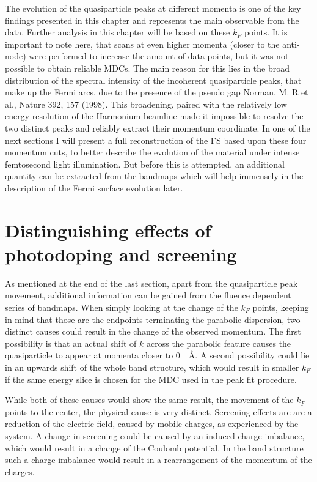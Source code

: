 The evolution of the quasiparticle peaks at different momenta is one of the key findings presented in this chapter and represents the main observable from the data.
Further analysis in this chapter will be based on these $k_F$ points.
It is important to note here, that scans at even higher momenta (closer to the anti-node) were performed to increase the amount of data points, but it was not possible to obtain reliable MDCs.
The main reason for this lies in the broad distribution of the spectral intensity of the incoherent quasiparticle peaks, that make up the Fermi arcs, due to the presence of the pseudo gap \cite{bibid} Norman, M. R et al., Nature 392, 157 (1998).
This broadening, paired with the relatively low energy resolution of the Harmonium beamline made it impossible to resolve the two distinct peaks and reliably extract their momentum coordinate.
In one of the next sections I will present a full reconstruction of the FS based upon these four momentum cuts, to better describe the evolution of the material under intense femtosecond light illumination.
But before this is attempted, an additional quantity can be extracted from the bandmaps which will help immensely in the description of the Fermi surface evolution later.


\section{Distinguishing effects of photodoping and screening}
\label{sec:mu}

As mentioned at the end of the last section, apart from the quasiparticle peak movement, additional information can be gained from the fluence dependent series of bandmaps.
When simply looking at the change of the $k_F$ points, keeping in mind that those are the endpoints terminating the parabolic dispersion, two distinct causes could result in the change of the observed momentum.
The first possibility is that an actual shift of $k$ across the parabolic feature causes the quasiparticle to appear at momenta closer to \qty{0}{\per\angstrom}.
A second possibility could lie in an upwards shift of the whole band structure, which would result in smaller $k_F$ if the same energy slice is chosen for the MDC used in the peak fit procedure.

While both of these causes would show the same result, the movement of the $k_F$ points to the center, the physical cause is very distinct.
Screening effects are are a reduction of the electric field, caused by mobile charges, as experienced by the system.
A change in screening could be caused by an induced charge imbalance, which would result in a change of the Coulomb potential.
In the band structure such a charge imbalance would result in a rearrangement of the momentum of the charges.

